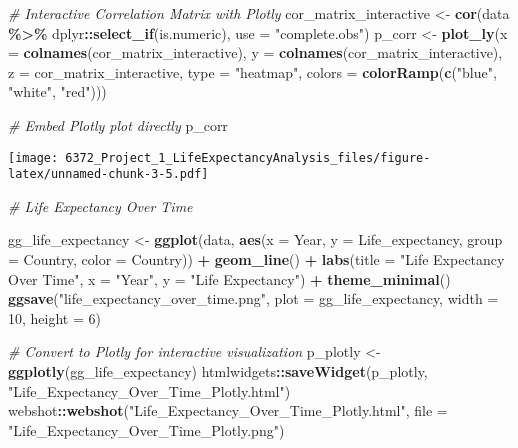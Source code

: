 \documentclass[
]{article}
\newenvironment{Shaded}{\begin{snugshade}}{\end{snugshade}}
\newcommand{\AttributeTok}[1]{\textcolor[rgb]{0.13,0.29,0.53}{#1}}
\newcommand{\CommentTok}[1]{\textcolor[rgb]{0.56,0.35,0.01}{\textit{#1}}}
\newcommand{\DecValTok}[1]{\textcolor[rgb]{0.00,0.00,0.81}{#1}}
\newcommand{\FunctionTok}[1]{\textcolor[rgb]{0.13,0.29,0.53}{\textbf{#1}}}
\newcommand{\NormalTok}[1]{#1}
\newcommand{\OtherTok}[1]{\textcolor[rgb]{0.56,0.35,0.01}{#1}}
\newcommand{\SpecialCharTok}[1]{\textcolor[rgb]{0.81,0.36,0.00}{\textbf{#1}}}
\newcommand{\StringTok}[1]{\textcolor[rgb]{0.31,0.60,0.02}{#1}}
\begin{document}
\begin{Shaded}
\begin{Highlighting}[]
\CommentTok{\# Interactive Correlation Matrix with Plotly}
\NormalTok{cor\_matrix\_interactive }\OtherTok{\textless{}{-}} \FunctionTok{cor}\NormalTok{(data }\SpecialCharTok{\%\textgreater{}\%}\NormalTok{ dplyr}\SpecialCharTok{::}\FunctionTok{select\_if}\NormalTok{(is.numeric), }\AttributeTok{use =} \StringTok{"complete.obs"}\NormalTok{)}
\NormalTok{p\_corr }\OtherTok{\textless{}{-}} \FunctionTok{plot\_ly}\NormalTok{(}\AttributeTok{x =} \FunctionTok{colnames}\NormalTok{(cor\_matrix\_interactive), }\AttributeTok{y =} \FunctionTok{colnames}\NormalTok{(cor\_matrix\_interactive), }\AttributeTok{z =}\NormalTok{ cor\_matrix\_interactive, }
                  \AttributeTok{type =} \StringTok{"heatmap"}\NormalTok{, }\AttributeTok{colors =} \FunctionTok{colorRamp}\NormalTok{(}\FunctionTok{c}\NormalTok{(}\StringTok{"blue"}\NormalTok{, }\StringTok{"white"}\NormalTok{, }\StringTok{"red"}\NormalTok{)))}

\CommentTok{\# Embed Plotly plot directly}
\NormalTok{p\_corr}
\end{Highlighting}
\end{Shaded}

\texttt{[image: 6372\_Project\_1\_LifeExpectancyAnalysis\_files/figure-latex/unnamed-chunk-3-5.pdf]}

\begin{Shaded}
\begin{Highlighting}[]
\CommentTok{\# Life Expectancy Over Time}

\NormalTok{gg\_life\_expectancy }\OtherTok{\textless{}{-}} \FunctionTok{ggplot}\NormalTok{(data, }\FunctionTok{aes}\NormalTok{(}\AttributeTok{x =}\NormalTok{ Year, }\AttributeTok{y =}\NormalTok{ Life\_expectancy, }\AttributeTok{group =}\NormalTok{ Country, }\AttributeTok{color =}\NormalTok{ Country)) }\SpecialCharTok{+}
  \FunctionTok{geom\_line}\NormalTok{() }\SpecialCharTok{+}
  \FunctionTok{labs}\NormalTok{(}\AttributeTok{title =} \StringTok{"Life Expectancy Over Time"}\NormalTok{,}
       \AttributeTok{x =} \StringTok{"Year"}\NormalTok{, }\AttributeTok{y =} \StringTok{"Life Expectancy"}\NormalTok{) }\SpecialCharTok{+}
  \FunctionTok{theme\_minimal}\NormalTok{()}
\FunctionTok{ggsave}\NormalTok{(}\StringTok{"life\_expectancy\_over\_time.png"}\NormalTok{, }\AttributeTok{plot =}\NormalTok{ gg\_life\_expectancy, }\AttributeTok{width =} \DecValTok{10}\NormalTok{, }\AttributeTok{height =} \DecValTok{6}\NormalTok{)}

\CommentTok{\# Convert to Plotly for interactive visualization}
\NormalTok{p\_plotly }\OtherTok{\textless{}{-}} \FunctionTok{ggplotly}\NormalTok{(gg\_life\_expectancy)}
\NormalTok{htmlwidgets}\SpecialCharTok{::}\FunctionTok{saveWidget}\NormalTok{(p\_plotly, }\StringTok{"Life\_Expectancy\_Over\_Time\_Plotly.html"}\NormalTok{)}
\NormalTok{webshot}\SpecialCharTok{::}\FunctionTok{webshot}\NormalTok{(}\StringTok{"Life\_Expectancy\_Over\_Time\_Plotly.html"}\NormalTok{, }\AttributeTok{file =} \StringTok{"Life\_Expectancy\_Over\_Time\_Plotly.png"}\NormalTok{)}
\end{Highlighting}
\end{Shaded}
\end{document}
